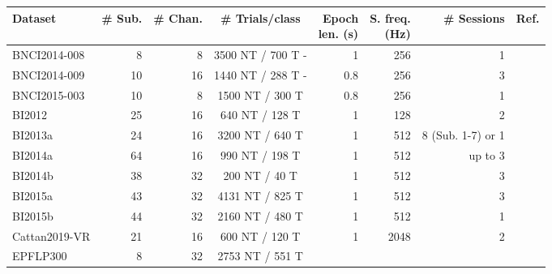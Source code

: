 \begin{tabularx}{\linewidth}{lrrcrrrr}
		\toprule
		Dataset        & \# Sub.               & \# Chan. & \# Trials/class
                   & \makecell{Epoch \\ len. (s)} & \makecell{S. freq.\\  (Hz)}
                   & \# Sessions & Ref. \\ \midrule
		BNCI2014-008  & 8                          & 8           & 3500 NT / 700 T
            -     &1&256& 1                          &                                         \\
		BNCI2014-009  & 10                         & 16          & 1440 NT / 288 T
            -     &0.8&256& 3                          &                                         \\
		BNCI2015-003  & 10                         & 8           & 1500 NT / 300 T
                   &0.8&256& 1                          &                                          \\
		BI2012         & 25                         & 16          & 640 NT / 128 T
                   &1& 128 & 2                          &                                          \\
		BI2013a        & 24                         & 16          & 3200 NT / 640 T
                   &1&512& 8 (Sub. 1-7) or 1          &                                          \\
		BI2014a        & 64                         & 16          & 990 NT / 198 T
                   &1&512& up to 3                    &                                          \\
		BI2014b        & 38                         & 32          & 200 NT / 40 T
                   &1&512& 3                          &                                          \\
		BI2015a        & 43                         & 32          & 4131 NT / 825 T
                   &1&512& 3                          &                                          \\
		BI2015b        & 44                         & 32          & 2160 NT / 480 T
                   &1&512& 1                          &                                          \\
		Cattan2019-VR & 21                         & 16          & 600 NT / 120 T
                   &1&2048& 2                          &                                          \\
		EPFLP300       & 8                          & 32          & 2753 NT / 551 T

\end{tabularx}
